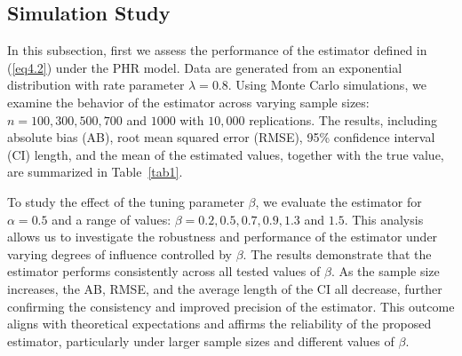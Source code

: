 \documentclass[12pt,a4paper]{article}
\numberwithin{equation}{section}
\begin{document}
\subsection{Simulation Study}
In this subsection, first we assess the performance of the estimator defined in  (\ref{eq4.2}) under the PHR model. Data are generated from an exponential distribution with rate parameter $\lambda = 0.8$. Using Monte Carlo simulations, we examine the behavior of the estimator across varying sample sizes: $n = 100, 300, 500, 700$ and $1000$ with $10,000$ replications. The results, including absolute bias (AB), root mean squared error (RMSE), 95\% confidence interval (CI) length, and the mean of the estimated values, together with the true value, are summarized in Table~\ref{tab1}.

To study the effect of the tuning parameter $\beta$, we evaluate the estimator for $\alpha=0.5$ and a range of values: $\beta = 0.2, 0.5, 0.7, 0.9, 1.3$ and $1.5$. This analysis allows us to investigate the robustness and performance of the estimator under varying degrees of influence controlled by $\beta$. The results demonstrate that the estimator performs consistently across all tested values of $\beta$. As the sample size increases, the AB, RMSE, and the average length of the CI all decrease, further confirming the consistency and improved precision of the estimator.
This outcome aligns with theoretical expectations and affirms the reliability of the proposed estimator, particularly under larger sample sizes and different values of $\beta$.
\end{document}
